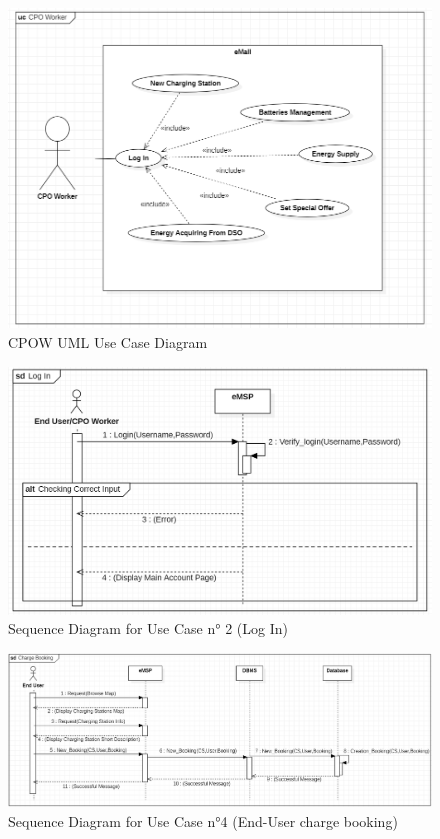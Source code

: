 \documentclass[a4paper]{report}
\begin{document}
\begin{figure}[p]
\includegraphics[width=\textwidth]{RASD/img/UC_CPOW.png}
\caption{CPOW UML Use Case Diagram}
\label{fig:class-diagramRASD}
\end{figure}
\restoregeometry



\begin{figure}[p]
\includegraphics[width=\textwidth]{RASD/img/SD_LogIn.png}
\caption{Sequence Diagram for Use Case n° 2 (Log In)}
\label{fig:class-diagramRASD}
\end{figure}

\begin{figure}[p]
\includegraphics[width=\textwidth]{RASD/img/SD_ChargeBooking.png}
\caption{Sequence Diagram for Use Case n°4 (End-User charge booking)}
\label{fig:class-diagramRASD}
\end{figure}
\restoregeometry
\end{document}
